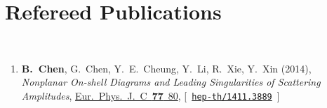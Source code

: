 \newcommand{\grqc}[1]{\href{http://arxiv.org/abs/#1}{\texttt{gr-qc/#1}}}
\newcommand{\hepth}[1]{\href{http://arxiv.org/abs/#1}{\texttt{hep-th/#1}}}


\newcommand{\baoyi}[1]{\textbf{B.~Chen},}


\section*{\sc Refereed Publications}~
\vspace{-.2in}

\begin{enumerate}

    \item 
    \baoyi,
    G.~Chen,
    Y.~E.~Cheung,  
    Y.~Li,         
    R.~Xie,
    Y.~Xin
    (2014),
    {\it Nonplanar On-shell Diagrams and Leading Singularities of Scattering Amplitudes},
    \href{http://dx.doi.org/10.1140/epjc/s10052-017-4659-2}{Eur.~Phys.~J.~C~{\bf77}~80},
    [~\hepth{1411.3889}~]
\end{enumerate}

